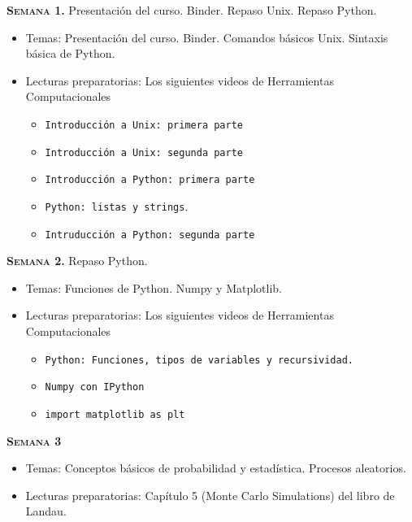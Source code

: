 \documentclass[letterpaper,10pt,onecolumn]{article}
\begin{document}

\noindent\textbf{\textsc{Semana 1.}} Presentaci\'on del curso. Binder. Repaso Unix. Repaso Python. \\[-0.5cm]
\begin{itemize}
\item Temas: 
Presentaci\'on del curso. Binder. Comandos b\'asicos Unix. 
Sintaxis b\'asica de Python. \\[-0.6cm] 
\item Lecturas preparatorias: Los siguientes videos de Herramientas Computacionales

\begin{itemize}
\item \texttt{Introducci\'on a Unix:
  primera parte}
\item \texttt{Introducci\'on a Unix: segunda parte}
\item \texttt{Introducci\'on a Python: primera parte}
\item \texttt{Python: listas y strings}.
\item  \texttt{Intruducci\'on a Python: segunda parte}
\end{itemize}
\end{itemize}


\noindent\textbf{\textsc{Semana 2.}} Repaso Python. \\[-0.5cm]
\begin{itemize}
\item Temas: 
Funciones de Python. Numpy y Matplotlib.\\[-0.6cm] 
\item Lecturas preparatorias: Los siguientes videos de Herramientas Computacionales

\begin{itemize}
\item \texttt{Python: Funciones, tipos de variables y recursividad.}
\item \texttt{Numpy con IPython}
\item \texttt{import matplotlib as plt}
\end{itemize}
\end{itemize}

\noindent\textbf{\textsc{Semana 3}}\\[-0.5cm]
\begin{itemize}
\item Temas: Conceptos b\'asicos de
  probabilidad y estad\'istica. Procesos aleatorios. \\[-0.6cm]  
\item Lecturas preparatorias: 
Cap\'itulo 5 (Monte Carlo Simulations) del libro de Landau.\\[-0.6cm]
\end{itemize}
\end{document}
